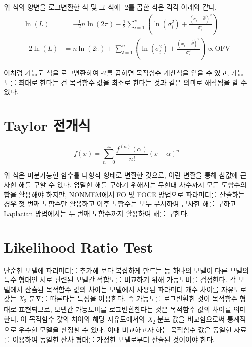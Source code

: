 \documentclass[
  10pt,
  krantz2,
  a4paper]{krantz}
\theoremstyle{definition}
\theoremstyle{definition}
\theoremstyle{definition}
\theoremstyle{remark}
\begin{document}
위 식의 양변을 로그변환한 식 및 그 식에 -2를 곱한 식은 각각 아래와 같다.
\begin{equation}
\begin{split}
  \ln{(L)} & = - \frac{1}{2}n\ln\left( 2\pi \right) - \frac{1}{2}\sum_{\mathcal{i} = 1}^{n}\left( \ln{(\sigma_{i}^{2})} + \frac{\left( x_{i} - \widehat{\theta} \right)^{2}}{\sigma_{i}^{2}} \right) \\
  -2\ln{(L)} & = n\ln\left( 2\pi \right) + \sum_{\mathcal{i} = 1}^{n}\left( \ln{(\sigma_{i}^{2})} + \frac{\left( x_{i} - \widehat{\theta} \right)^{2}}{\sigma_{i}^{2}} \right) \propto \text{OFV}
\end{split}
\label{eq:2ll}
\end{equation}

이처럼 가능도 식을 로그변환하여 -2를 곱하면 목적함수 계산식을 얻을 수 있고, 가능도를 최대로 한다는 건 목적함수 값을 최소로 한다는 것과 같은 의미로 해석됨을 알 수 있다.

\hypertarget{taylor-uxc804uxac1cuxc2dd}{%
\section{Taylor 전개식}\label{taylor-uxc804uxac1cuxc2dd}}

\begin{equation}
f(x) = \sum_{n = 0}^{\infty}\frac{f^{\left( n \right)}\left( \alpha \right)}{n!}{(x - \alpha)}^{n}
\label{eq:taylor}
\end{equation}

위 식은 미분가능한 함수를 다항식 형태로 변환한 것으로, 이런 변환을 통해 참값에 근사한 해를 구할 수 있다. 엄밀한 해를 구하기 위해서는 무한대 차수까지 모든 도함수의 합을 활용해야 하지만, NONMEM에서 FO 및 FOCE 방법으로 파라미터를 산출하는 경우 첫 번째 도함수만 활용하고 이후 도함수는 모두 무시하여 근사한 해를 구하고 Laplacian 방법에서는 두 번째 도함수까지 활용하여 해를 구한다.

\hypertarget{likelihood-ratio-test}{%
\section{Likelihood Ratio Test}\label{likelihood-ratio-test}}

단순한 모델에 파라미터를 추가해 보다 복잡하게 만드는 등 하나의 모델이 다른 모델의 특수 형태인 서로 관련된 모델간 적합도를 비교하기 위해 가능도비를 검정한다. 각 모델에서 산출된 목적함수 값의 차이는 모델에서 사용된 파라미터 개수 차이를 자유도로 갖는 \emph{Χ}\textsubscript{2} 분포를 따른다는 특성을 이용한다. 즉 가능도를 로그변환한 것이 목적함수 형태로 표현되므로, 모델간 가능도비를 로그변환한다는 것은 목적함수 값의 차이를 의미한다. 이 목적함수 값의 차이와 해당 자유도에서의 \emph{Χ}\textsubscript{2} 분포 값을 비교함으로써 통계적으로 우수한 모델을 판정할 수 있다. 이때 비교하고자 하는 목적함수 값은 동일한 자료를 이용하여 동일한 잔차 형태를 가정한 모델로부터 산출된 것이어야 한다.
\end{document}
